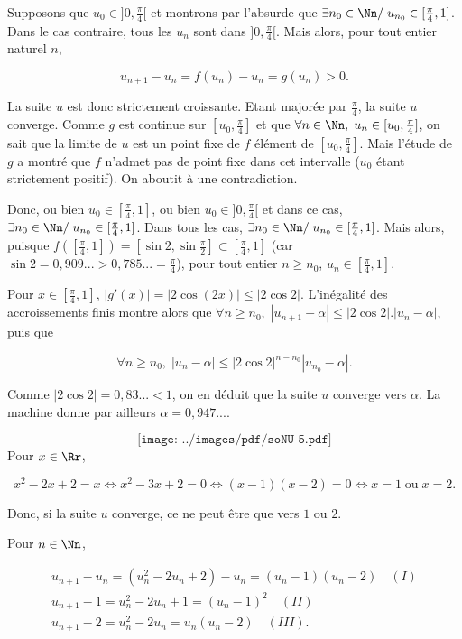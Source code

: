 {{Supposons que $u_0\in]0,\frac{\pi}{4}[$ et montrons par l'absurde que $\exists n_0\in\Nn/\;u_{n_0}\in[\frac{\pi}{4},1]$. Dans le cas contraire, tous les $u_n$ sont dans $]0,\frac{\pi}{4}[$. Mais alors, pour tout entier naturel $n$,

$$u_{n+1}-u_n=f(u_n)-u_n=g(u_n)>0.$$

La suite $u$ est donc strictement croissante. Etant majorée par $\frac{\pi}{4}$, la suite $u$ converge. Comme $g$ est continue sur $[u_0,\frac{\pi}{4}]$ et que $\forall n\in\Nn,\;u_n\in[u_0,\frac{\pi}{4}]$, on sait que la limite de $u$ est un point fixe de $f$ élément de $[u_0,\frac{\pi}{4}]$. Mais l'étude de $g$ a montré que $f$ n'admet pas de point fixe dans cet intervalle ($u_0$ étant strictement positif). On aboutit à une contradiction.

Donc, ou bien $u_0\in[\frac{\pi}{4},1]$, ou bien $u_0\in]0,\frac{\pi}{4}[$ et dans ce cas, $\exists n_0\in\Nn/\;u_{n_0}\in[\frac{\pi}{4},1]$. Dans tous les cas, $\exists n_0\in\Nn/\;u_{n_0}\in[\frac{\pi}{4},1]$. Mais alors, puisque $f([\frac{\pi}{4},1])=[\sin2,\sin\frac{\pi}{2}]\subset[\frac{\pi}{4},1]$ (car $\sin2=0,909...>0,785...=\frac{\pi}{4}$), pour tout entier $n\geq n_0$, $u_n\in[\frac{\pi}{4},1]$.

Pour $x\in[\frac{\pi}{4},1]$, $|g'(x)|=|2\cos(2x)|\leq|2\cos2|$. L'inégalité des accroissements finis montre alors que $\forall n\geq n_0,\;|u_{n+1}-\alpha|\leq|2\cos2|.|u_n-\alpha|$, puis que 

$$\forall n\geq n_0,\;|u_n-\alpha|\leq|2\cos2|^{n-n_0}|u_{n_0}-\alpha|.$$

Comme $|2\cos2|=0,83...<1$, on en déduit que la suite $u$ converge vers $\alpha$. La machine donne par ailleurs $\alpha=0,947...$.

$$\texttt{[image: ../images/pdf/soNU-5.pdf]}$$
Pour $x\in\Rr$,

$$x^2-2x+2=x\Leftrightarrow x^2-3x+2=0\Leftrightarrow(x-1)(x-2)=0\Leftrightarrow x=1\;\mbox{ou}\;x=2.$$

Donc, si la suite $u$ converge, ce ne peut être que vers $1$ ou $2$.

Pour $n\in\Nn$,

$$\begin{array}{l}
u_{n+1}-u_n=(u_n^2-2u_n+2)-u_n=(u_n-1)(u_n-2)\quad(I)\\
u_{n+1}-1=u_n^2-2u_n+1=(u_n-1)^2\quad(II)\\
u_{n+1}-2=u_n^2-2u_n=u_n(u_n-2)\quad(III).
\end{array}
$$

}}
